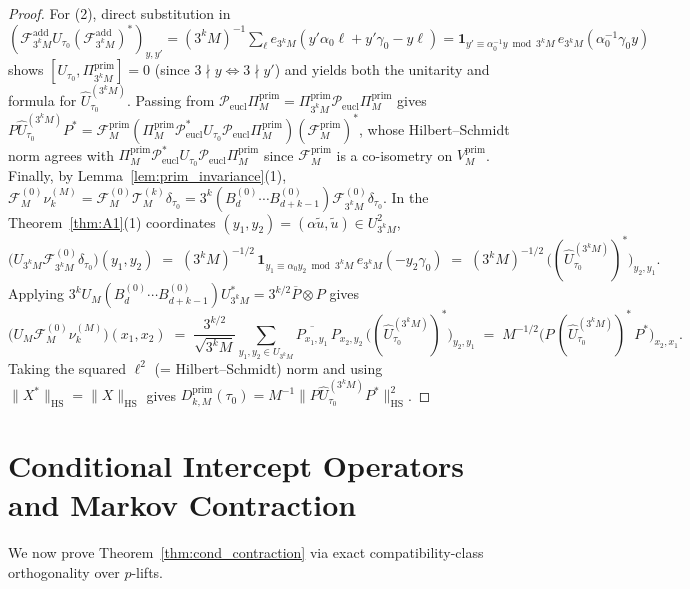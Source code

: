 \documentclass[11pt,a4paper]{article}
\numberwithin{equation}{section}
\theoremstyle{definition}
\theoremstyle{remark}
\newcommand{\cF}{\mathcal{F}}
\newcommand{\cT}{\mathcal{T}}
\newcommand{\cP}{\mathcal{P}}
\newcommand{\prim}{\mathrm{prim}}
\newcommand{\HS}{\mathrm{HS}}
\begin{document}
\begin{proof}
For (2), direct substitution in $(\cF_{3^k M}^{\mathrm{add}} U_{\tau_0} (\cF_{3^k M}^{\mathrm{add}})^*)_{y, y'} = (3^k M)^{-1}\sum_\ell e_{3^k M}(y'\alpha_0\ell + y'\gamma_0 - y\ell) = \mathbf{1}_{y' \equiv \alpha_0^{-1} y \bmod 3^k M}\,e_{3^k M}(\alpha_0^{-1}\gamma_0 y)$ shows $[U_{\tau_0}, \Pi_{3^k M}^{\prim}] = 0$ (since $3\nmid y \iff 3\nmid y'$) and yields both the unitarity and formula for $\widehat{U}_{\tau_0}^{(3^k M)}$. Passing from $\cP_{\mathrm{eucl}}\Pi_M^{\prim} = \Pi_{3^k M}^{\prim}\cP_{\mathrm{eucl}}\Pi_M^{\prim}$ gives $P\widehat{U}_{\tau_0}^{(3^k M)}P^* = \cF_M^{\prim}(\Pi_M^{\prim}\cP_{\mathrm{eucl}}^* U_{\tau_0}\cP_{\mathrm{eucl}}\Pi_M^{\prim})(\cF_M^{\prim})^*$, whose Hilbert--Schmidt norm agrees with $\Pi_M^{\prim}\cP_{\mathrm{eucl}}^* U_{\tau_0}\cP_{\mathrm{eucl}}\Pi_M^{\prim}$ since $\cF_M^{\prim}$ is a co-isometry on $V_M^{\prim}$. Finally, by Lemma~\ref{lem:prim_invariance}(1), $\cF_M^{(0)}\nu_k^{(M)} = \cF_M^{(0)}\cT_M^{(k)}\delta_{\tau_0} = 3^k(B_d^{(0)}\cdots B_{d+k-1}^{(0)})\cF_{3^k M}^{(0)}\delta_{\tau_0}$. In the Theorem~\ref{thm:A1}(1) coordinates $(y_1, y_2) = (\alpha\tilde u, \tilde u) \in U_{3^k M}^2$,
\[
\bigl(U_{3^k M}\cF_{3^k M}^{(0)}\delta_{\tau_0}\bigr)(y_1, y_2) \;=\; (3^k M)^{-1/2}\,\mathbf{1}_{y_1 \equiv \alpha_0 y_2 \bmod 3^k M}\,e_{3^k M}(-y_2\gamma_0) \;=\; (3^k M)^{-1/2}\,\bigl((\widehat{U}_{\tau_0}^{(3^k M)})^*\bigr)_{y_2, y_1}.
\]
Applying $3^k U_M(B_d^{(0)}\cdots B_{d+k-1}^{(0)})U_{3^k M}^* = 3^{k/2}\overline{P}\otimes P$ gives
\[
\bigl(U_M\cF_M^{(0)}\nu_k^{(M)}\bigr)(x_1, x_2) \;=\; \frac{3^{k/2}}{\sqrt{3^k M}}\sum_{y_1, y_2 \in U_{3^k M}} \overline{P_{x_1, y_1}}\, P_{x_2, y_2}\, \bigl((\widehat{U}_{\tau_0}^{(3^k M)})^*\bigr)_{y_2, y_1} \;=\; M^{-1/2}\bigl(P\,(\widehat{U}_{\tau_0}^{(3^k M)})^*\,P^*\bigr)_{x_2, x_1}.
\]
Taking the squared $\ell^2$ (= Hilbert--Schmidt) norm and using $\|X^*\|_{\HS} = \|X\|_{\HS}$ gives $D_{k, M}^{\prim}(\tau_0) = M^{-1}\|P\widehat{U}_{\tau_0}^{(3^k M)}P^*\|_{\HS}^2$.
\end{proof}

\section{Conditional Intercept Operators and Markov Contraction}\label{sec:cond_contraction}

We now prove Theorem~\ref{thm:cond_contraction} via exact compatibility-class orthogonality over $p$-lifts.
\end{document}
